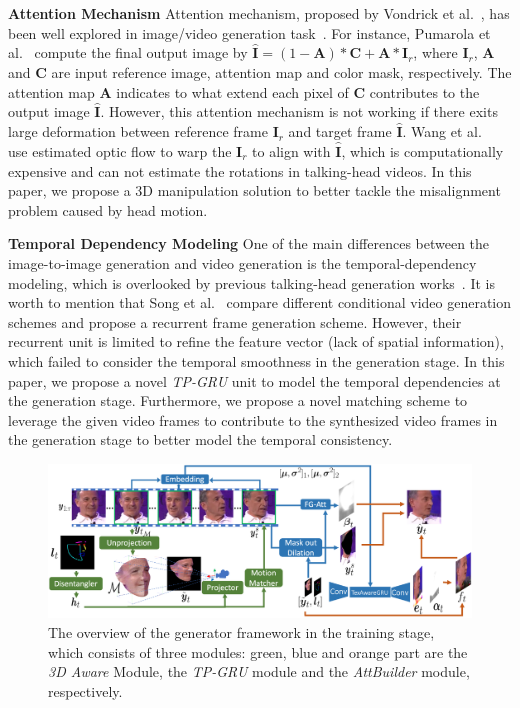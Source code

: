 \documentclass[runningheads]{llncs}
\begin{document}
\noindent \textbf{Attention Mechanism} \quad Attention mechanism, proposed by Vondrick et al.~\cite{vondrick2016generating}, has been well explored in image/video generation task~\cite{vondrick2016generating,wang2018vid2vid,pumarola2019ganimation,chen2019hierarchical}. For instance, Pumarola et al.~\cite{pumarola2019ganimation} compute the final output image by $\hat{\mathbf{I}} = (1 - \mathbf{A}) * \mathbf{C} + \mathbf{A} * \mathbf{I}_r $, where $\mathbf{I}_r$, $\mathbf{A}$ and $\mathbf{C}$ are input reference image, attention map and color mask, respectively. The attention map $\mathbf{A}$ indicates to what extend each pixel of $\mathbf{C}$ contributes to the output image $\hat{\mathbf{I}}$. However, this attention mechanism is not working if there exits large deformation between reference frame $\mathbf{I}_r$ and target frame $\hat{\mathbf{I}}$. Wang et al.~\cite{wang2018high} use estimated optic flow to warp the $\mathbf{I}_r$ to align with $\hat{\mathbf{I}}$, which is computationally expensive and can not estimate the rotations in talking-head videos. In this paper, we propose a 3D manipulation solution to better tackle the misalignment problem caused by head motion. 

\noindent \textbf{Temporal Dependency Modeling} \quad 
One of the main differences between the image-to-image generation and video generation is the temporal-dependency modeling, which is overlooked by previous talking-head generation works~\cite{chung2017you,wiles2018x2face,zakharov2019few,chen2018lip}. It is worth to mention that Song et al.~\cite{ijcai2019-129} compare different conditional video generation schemes and propose a recurrent frame generation scheme. However, their recurrent unit is limited to refine the feature vector (lack of spatial information), which failed to consider the temporal smoothness in the generation stage. In this paper, we propose a novel \textit{TP-GRU} unit to model the temporal dependencies at the generation stage. Furthermore, we propose a novel matching scheme to leverage the given video frames to contribute to the synthesized video frames in the generation stage to better model the temporal consistency.
\begin{figure}[ht]
\includegraphics[width=1.0 \linewidth]{latex/images/main.pdf}
\caption{The overview of the generator framework in the training stage, which consists of three modules: green, blue and orange part are the \textit{3D Aware} Module, the \textit{TP-GRU} module and the \textit{AttBuilder} module, respectively.}
\label{fig:main}
\end{figure}
\end{document}
